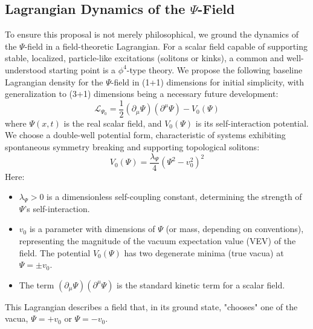 \documentclass{report}
\begin{document}
    \subsection{Lagrangian Dynamics of the $\Psi$-Field}
    \label{subsec:lagrangian_psi}
    To ensure this proposal is not merely philosophical, we ground the dynamics of the $\Psi$-field in a
    field-theoretic Lagrangian. For a scalar field capable of supporting stable, localized, particle-like
    excitations (solitons or kinks), a common and well-understood starting point is a $\phi^4$-type theory.
    We propose the following baseline Lagrangian density for the $\Psi$-field in (1+1) dimensions for
    initial simplicity, with generalization to (3+1) dimensions being a necessary future development:
    \begin{equation}
        \mathcal{L}_{\Psi_0} = \frac{1}{2}(\partial_{\mu}\Psi)(\partial^{\mu}\Psi) - V_0(\Psi)
    \end{equation}
    where $\Psi(x, t)$ is the real scalar field, and $V_0(\Psi)$ is its self-interaction potential. We choose a
    double-well potential form, characteristic of systems exhibiting spontaneous symmetry breaking
    and supporting topological solitons:
    \begin{equation}
        V_0(\Psi) = \frac{\lambda_{\Psi}}{4}(\Psi^2 - v_0^2)^2
    \end{equation}
    Here:
    \begin{itemize}
        \item $\lambda_{\Psi} > 0$ is a dimensionless self-coupling constant, determining the strength of $\Psi$’s self-interaction.
        \item $v_0$ is a parameter with dimensions of $\Psi$ (or mass, depending on conventions), representing the magnitude of the vacuum expectation value (VEV) of the field. The potential $V_0(\Psi)$ has two degenerate minima (true vacua) at $\Psi = \pm v_0$.
        \item The term $(\partial_{\mu}\Psi)(\partial^{\mu}\Psi)$ is the standard kinetic term for a scalar field.
    \end{itemize}
    This Lagrangian describes a field that, in its ground state, "chooses" one of the vacua, $\Psi = +v_0$ or $\Psi = -v_0$.
\end{document}
